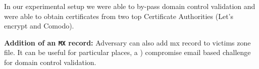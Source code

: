 In our experimental setup we were able to by-pass domain control validation and were able to obtain certificates from two top Certificate Authorities (Let's encrypt and Comodo). %

\textbf{ Addition of an \texttt{MX} record:} 
Adversary can also add mx record to victims zone file. It can be useful for particular places, a ) compromise email based challenge for domain control validation. %


